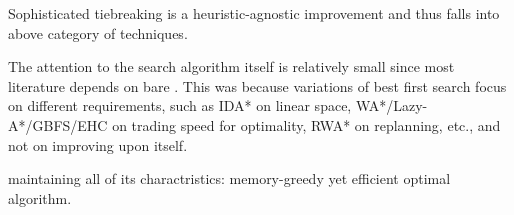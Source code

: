 Sophisticated tiebreaking is a heuristic-agnostic improvement and thus 
falls into above category of techniques.

The attention to the search algorithm itself is relatively small since
most literature depends on bare \astar.  This was because variations of
best first search focus on different requirements, such as IDA* on
linear space, WA*/Lazy-A*/GBFS/EHC on trading speed for optimality, RWA*
on replanning, etc., and not on improving upon \astar itself.

maintaining all of its charactristics: memory-greedy yet efficient
optimal algorithm.
